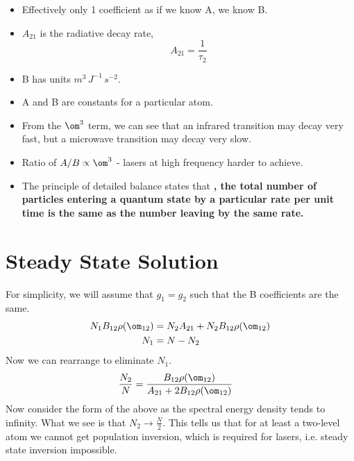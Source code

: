 \documentclass[a4paper, 11pt, normalem]{report}
\begin{document}
\begin{itemize}
    \item Effectively only 1 coefficient as if we know A, we know B.
    \item $A_{21}$ is the radiative decay rate,
        \begin{equation}
            A_{21} = \frac{1}{\tau_2}
        \end{equation}
    \item B has units $m^3\,J^{-1}\,s^{-2}$.
    \item A and B are constants for a particular atom.
    \item From the $\om^3$ term, we can see that an infrared transition may decay very fast, but a microwave transition may decay very slow.
    \item Ratio of $A/B \propto \om^3$ - lasers at high frequency harder to achieve.
    \item The principle of detailed balance states that \textbf{, the total number of particles entering a quantum state by a particular rate per unit time is the same as the number leaving by the same rate.}
\end{itemize}

\section{Steady State Solution}
For simplicity, we will assume that $g_1=g_2$ such that the B coefficients are the same.
\begin{align}
    N_1B_{12}\rho(\om_{12}) &= N_2A_{21} + N_2B_{12}\rho(\om_{12}) \\
    N_1 &= N - N_2
\end{align}
Now we can rearrange to eliminate $N_1$.
\begin{align}
    \frac{N_2}{N} &= \frac{B_{12}\rho(\om_{12})}{A_{21}+2B_{12}\rho(\om_{12})}
\end{align}
Now consider the form of the above as the spectral energy density tends to infinity.
What we see  is that $N_2 \to \frac{N}{2}$.
This tells us that for at least a two-level atom we cannot get population inversion, which is required for lasers, i.e. steady state inversion impossible.
\end{document}
